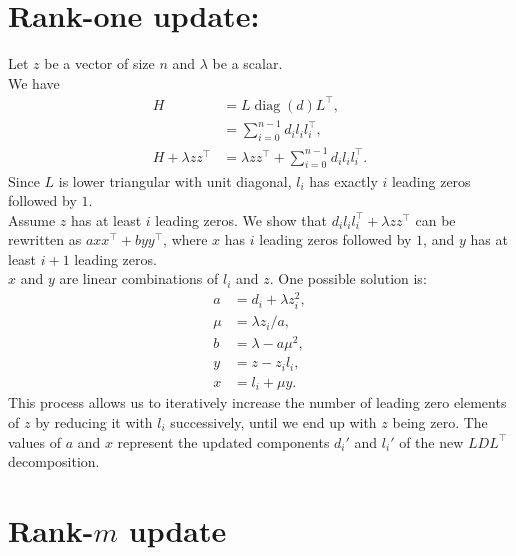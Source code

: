 \documentclass{article}
\DeclareMathOperator{\diag}{diag}
\begin{document}
\section{Rank-one update:}%
\label{sec:Rank-one_update}
Let $z$ be a vector of size $n$ and $\lambda$ be a scalar.\\
We have
\begin{align}
	\label{eq:unfold}
	H                     & = L\diag(d)L^{\top},                                       \\
	                      & = \sum_{i=0}^{n-1} d_i l_i l_i^{\top},                     \\
	H + \lambda zz^{\top} & = \lambda zz^{\top} + \sum_{i=0}^{n-1} d_i l_i l_i^{\top}.
\end{align}
Since $L$ is lower triangular with unit diagonal, $l_i$ has exactly $i$ leading zeros followed by $1$.\\
Assume $z$ has at least $i$ leading zeros.
We show that $d_i l_i l_i^{\top} + \lambda zz^{\top}$ can be rewritten as $a x x^{\top} + b yy^{\top}$, where $x$ has $i$ leading zeros followed by $1$, and $y$ has at least $i+1$ leading zeros.\\
$x$ and $y$ are linear combinations of $l_i$ and $z$.
One possible solution is:
\begin{align}
	\label{eq:lincomb}
	a   & = d_i + \lambda z_i^2, \\
	\mu & = \lambda z_i/a,       \\
	b   & = \lambda - a\mu^2,    \\
	y   & = z - z_i l_i,         \\
	x   & = l_i + \mu y.
\end{align}
This process allows us to iteratively increase the number of leading zero elements of $z$ by reducing it with $l_i$ successively, until we end up with $z$ being zero.
The values of $a$ and $x$ represent the updated components $d_i'$ and $l_i'$ of the new $LDL^{\top}$ decomposition.

\section{Rank-$m$ update}%
\label{sec:Rank-$m$_update}
\end{document}
